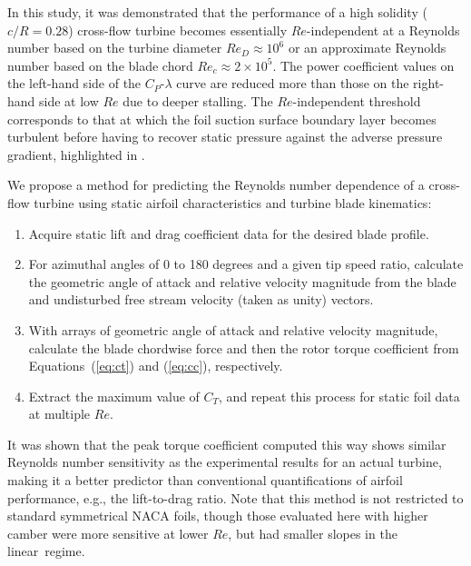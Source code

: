 In this study, it was demonstrated that the performance of a high solidity
($c/R=0.28$) cross-flow turbine becomes essentially $Re$-independent at a
Reynolds number based on the turbine diameter $Re_D \approx 10^6$ or an
approximate Reynolds number based on the blade chord $Re_c \approx 2 \times
10^5$. The power coefficient values on the left-hand side of the $C_P$-$\lambda$
curve are reduced more than those on the right-hand side at low $Re$ due to
deeper stalling. The $Re$-independent threshold corresponds to that at which the
foil suction surface boundary layer becomes turbulent before having to recover
static pressure against the adverse pressure gradient, highlighted in
\cite{Lissaman1983, McMasters1980, Carmichael1981}.

We propose a method for predicting the Reynolds number dependence of a cross-flow
turbine using static airfoil characteristics and turbine blade kinematics:
\begin{enumerate}
    \item Acquire static lift and drag coefficient data for the desired blade
    profile.
    
    \item For azimuthal angles of 0 to 180 degrees and a given tip speed ratio,
    calculate the geometric angle of attack and relative velocity magnitude from
    the blade and undisturbed free stream velocity (taken as unity) vectors.
    
    \item With arrays of geometric angle of attack and relative velocity
    magnitude, calculate the blade chordwise force and then the rotor torque
    coefficient from Equations~(\ref{eq:ct}) and (\ref{eq:cc}), respectively.
    
    \item Extract the maximum value of $C_T$, and repeat this process for static
    foil data at multiple $Re$.
\end{enumerate}

It was shown that the peak torque coefficient computed this way shows similar
Reynolds number sensitivity as the experimental results for an actual turbine,
making it a better predictor than conventional quantifications of airfoil
performance, e.g., the lift-to-drag ratio. Note that this method is not
restricted to standard symmetrical NACA foils, though those evaluated here with
higher camber were more sensitive at lower $Re$, but had smaller slopes in the
linear~regime.

